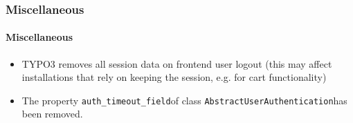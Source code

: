 %

\begin{frame}[fragile]
	\frametitle{Miscellaneous}
	\framesubtitle{Miscellaneous}

	\begin{itemize}
		\item TYPO3 removes all session data on frontend user logout\newline
			\small(this may affect installations that rely on keeping the session, e.g. for cart functionality)\normalsize

		\item The property \small\texttt{auth\_timeout\_field}\normalsize of class
			\small\texttt{AbstractUserAuthentication}\normalsize has been removed.

	\end{itemize}

\end{frame}


